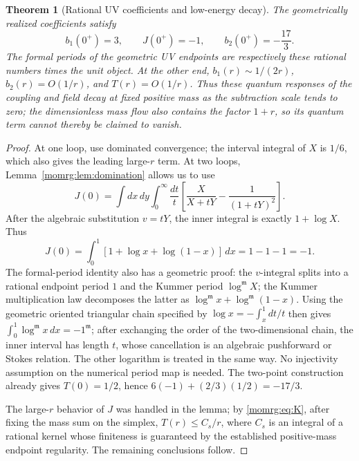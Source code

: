 \documentclass[11pt,a4paper,oneside]{article}
\theoremstyle{plain}
\newtheorem{theorem}{Theorem}[section]
\theoremstyle{definition}
\theoremstyle{remark}
\numberwithin{equation}{section}
\begin{document}
\begin{theorem}[Rational UV coefficients and low-energy decay]\label{momrg:thm:UV}
The geometrically realized coefficients satisfy
\begin{equation}\label{momrg:eq:UV}
 b_1(0^+)=3,\qquad J(0^+)=-1,\qquad
 b_2(0^+)=-\frac{17}{3}.
\end{equation}
The formal periods of the geometric UV endpoints are respectively these rational numbers times the unit object.
At the other end, $b_1(r)\sim1/(2r)$,
$b_2(r)=O(1/r)$, and $T(r)=O(1/r)$.
Thus these quantum responses of the coupling and field decay at fixed positive mass as the subtraction scale tends to zero;
the dimensionless mass flow also contains the factor $1+r$, so its quantum term cannot thereby be claimed to vanish.
\end{theorem}
\begin{proof}
At one loop, use dominated convergence; the interval integral of $X$ is $1/6$, which also gives the leading large-$r$ term.
At two loops, Lemma~\ref{momrg:lem:domination} allows us to use
\begin{equation}\label{momrg:eq:massless}
 J(0)=\int dx\,dy\int_0^\infty\frac{dt}{t}
       \left[\frac{X}{X+tY}-\frac1{(1+tY)^2}\right].
\end{equation}
After the algebraic substitution $v=tY$, the inner integral is exactly $1+\log X$.
Thus
\[
 J(0)=\int_0^1[1+\log x+\log(1-x)]\,dx=1-1-1=-1.
\]
The formal-period identity also has a geometric proof: the $v$-integral splits into a rational endpoint period $1$
and the Kummer period $\log^{\mathfrak m}X$;
the Kummer multiplication law decomposes the latter as $\log^{\mathfrak m}x+\log^{\mathfrak m}(1-x)$.
Using the geometric oriented triangular chain specified by
$\log x=-\int_x^1dt/t$ then gives
$\int_0^1\log^{\mathfrak m}x\,dx=-1^{\mathfrak m}$;
after exchanging the order of the two-dimensional chain, the inner interval has length $t$, whose cancellation is an algebraic pushforward or Stokes relation.
The other logarithm is treated in the same way.
No injectivity assumption on the numerical period map is needed.
The two-point construction already gives $T(0)=1/2$, hence $6(-1)+(2/3)(1/2)=-17/3$.

The large-$r$ behavior of $J$ was handled in the lemma;
by \eqref{momrg:eq:K}, after fixing the mass sum on the simplex,
$T(r)\leq C_s/r$,
where $C_s$ is an integral of a rational kernel whose finiteness is guaranteed by the established positive-mass endpoint regularity.
The remaining conclusions follow.
\end{proof}
\end{document}
